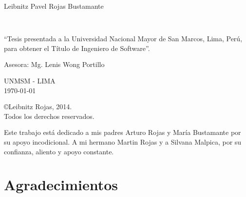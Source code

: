 \newpage
\begin{center}
    Leibnitz Pavel Rojas Bustamante
\end{center}
\vspace*{3cm}
\begin{Large}
\textbf{\miTesisTitulo} \\
\end{Large}
\vspace*{5cm}
\begin{flushright}
    \begin{minipage}{.5\textwidth}
    ``Tesis presentada a la Universidad Nacional Mayor de San Marcos, Lima, Perú, para obtener el Título de Ingeniero de Software''.
    \end{minipage}
    \end{flushright}
\vspace*{3cm}
\begin{flushright}
    \begin{minipage}{.5\textwidth}
    Asesora: Mg. Lenis Wong Portillo
    \end{minipage}
\end{flushright}
\vspace*{3cm}
\begin{center}
    UNMSM - LIMA\\
    \today
\end{center}

\newpage
\vspace*{\fill}
\begin{center}
\copyright \hspace{0.2cm}Leibnitz Rojas, 2014.\\
Todos los derechos reservados.
\end{center}

\newpage
\clearpage
\vspace*{\fill}
\begin{flushright}
\begin{minipage}{.5\textwidth}
Este trabajo está dedicado a mis padres Arturo Rojas y María Bustamante por su apoyo incodicional. A mi hermano Martin Rojas y a Silvana Malpica, por su confianza, aliento y apoyo constante.\\
\end{minipage}
\end{flushright}
\vfill %
\newpage
\chapter*{Agradecimientos}

